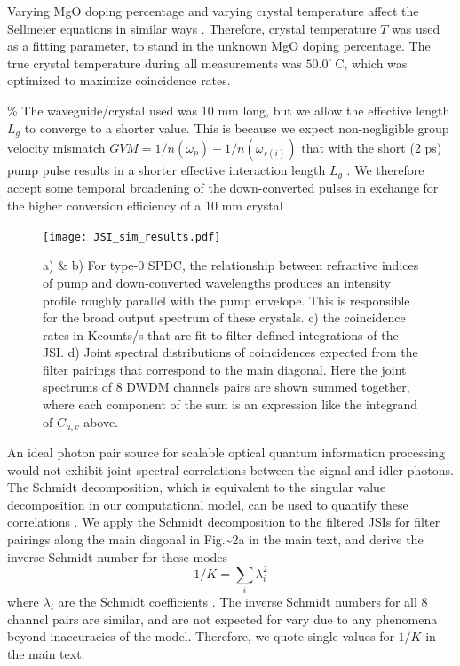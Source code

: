 \documentclass[11pt]{caltech_thesis} %
\begin{document}
Varying MgO doping percentage and varying crystal temperature affect the Sellmeier equations in similar ways \cite{Gayer2008, Jundt1997}. Therefore, crystal temperature $T$ was used as a fitting parameter, to stand in the unknown MgO doping percentage. The true crystal temperature during all measurements was $50.0^{\circ}~\mathrm{C}$, which was optimized to maximize coincidence rates.

\% The waveguide/crystal used was 10 mm long, but we allow the effective length $L_g$ to converge to a shorter value. This is because we expect non-negligible group velocity mismatch $GVM = 1/n(\omega_p) - 1/n(\omega_{s(i)})$ that with the short (2 ps) pump pulse results in a shorter effective interaction length $L_g$ \cite{SchoberThesis2005}. We therefore accept some temporal broadening of the down-converted pulses in exchange for the higher conversion efficiency of a 10 mm crystal

\begin{figure}[H]
    \centering
    \texttt{[image: JSI\_sim\_results.pdf]}
    \caption{a) \& b) For type-0 SPDC, the relationship between refractive indices of pump and down-converted wavelengths produces an intensity profile roughly parallel with the pump envelope. This is responsible for the broad output spectrum of these crystals. c) the coincidence rates in Kcounts/s that are fit to filter-defined integrations of the JSI. d) Joint spectral distributions of coincidences expected from the filter pairings that correspond to the main diagonal. Here the joint spectrums of 8 DWDM channels pairs are shown summed together, where each component of the sum is an expression like the integrand of $C_{u,v}$ above. }
    \label{fig:jsi_sim}
\end{figure}

An ideal photon pair source for scalable optical quantum information processing would not exhibit joint spectral correlations between the signal and idler photons. The Schmidt decomposition, which is equivalent to the singular value decomposition in our computational model, can be used to quantify these correlations \cite{ZielnickiKwiat2018SPDCmodel}. We apply the Schmidt decomposition to the filtered JSIs for filter pairings along the main diagonal in Fig.\textasciitilde2a in the main text, and derive the inverse Schmidt number for these modes
$$1/K = \sum_i \lambda_i^2$$
where $\lambda_i$ are the Schmidt coefficients \cite{ZielnickiKwiat2018SPDCmodel}. The inverse Schmidt numbers for all 8 channel pairs are similar, and are not expected for vary due to any phenomena beyond inaccuracies of the model. Therefore, we quote single values for $1/K$ in the main text.
\end{document}
